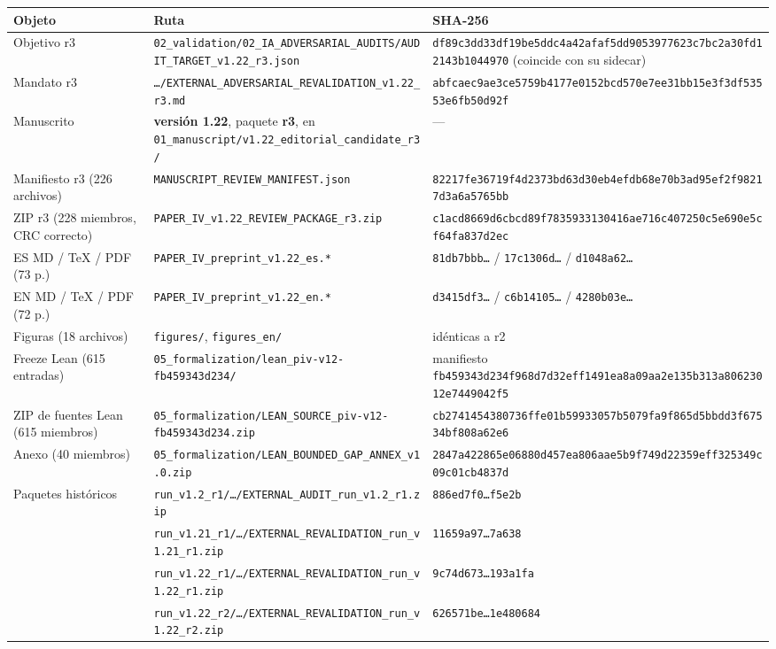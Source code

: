 \documentclass[
]{article}
\newcounter{none} %
\begin{document}
{\def\LTcaptype{none} %
\begin{longtable}[]{@{}lll@{}}
\toprule\noalign{}
Objeto & Ruta & SHA-256 \\
\midrule\noalign{}
\endhead
\bottomrule\noalign{}
\endlastfoot
Objetivo r3 &
\texttt{02\_validation/02\_IA\_ADVERSARIAL\_AUDITS/AUDIT\_TARGET\_v1.22\_r3.json}
&
\texttt{df89c3dd33df19be5ddc4a42afaf5dd9053977623c7bc2a30fd12143b1044970}
(coincide con su sidecar) \\
Mandato r3 &
\texttt{…/EXTERNAL\_ADVERSARIAL\_REVALIDATION\_v1.22\_r3.md} &
\texttt{abfcaec9ae3ce5759b4177e0152bcd570e7ee31bb15e3f3df53553e6fb50d92f} \\
Manuscrito & \textbf{versión 1.22}, paquete \textbf{r3}, en
\texttt{01\_manuscript/v1.22\_editorial\_candidate\_r3/} & --- \\
Manifiesto r3 (226 archivos) &
\texttt{MANUSCRIPT\_REVIEW\_MANIFEST.json} &
\texttt{82217fe36719f4d2373bd63d30eb4efdb68e70b3ad95ef2f98217d3a6a5765bb} \\
ZIP r3 (228 miembros, CRC correcto) &
\texttt{PAPER\_IV\_v1.22\_REVIEW\_PACKAGE\_r3.zip} &
\texttt{c1acd8669d6cbcd89f7835933130416ae716c407250c5e690e5cf64fa837d2ec} \\
ES MD / TeX / PDF (73 p.) & \texttt{PAPER\_IV\_preprint\_v1.22\_es.*} &
\texttt{81db7bbb…} / \texttt{17c1306d…} / \texttt{d1048a62…} \\
EN MD / TeX / PDF (72 p.) & \texttt{PAPER\_IV\_preprint\_v1.22\_en.*} &
\texttt{d3415df3…} / \texttt{c6b14105…} / \texttt{4280b03e…} \\
Figuras (18 archivos) & \texttt{figures/}, \texttt{figures\_en/} &
idénticas a r2 \\
Freeze Lean (615 entradas) &
\texttt{05\_formalization/lean\_piv-v12-fb459343d234/} & manifiesto
\texttt{fb459343d234f968d7d32eff1491ea8a09aa2e135b313a80623012e7449042f5} \\
ZIP de fuentes Lean (615 miembros) &
\texttt{05\_formalization/LEAN\_SOURCE\_piv-v12-fb459343d234.zip} &
\texttt{cb2741454380736ffe01b59933057b5079fa9f865d5bbdd3f67534bf808a62e6} \\
Anexo (40 miembros) &
\texttt{05\_formalization/LEAN\_BOUNDED\_GAP\_ANNEX\_v1.0.zip} &
\texttt{2847a422865e06880d457ea806aae5b9f749d22359eff325349c09c01cb4837d} \\
Paquetes históricos &
\texttt{run\_v1.2\_r1/…/EXTERNAL\_AUDIT\_run\_v1.2\_r1.zip} &
\texttt{886ed7f0…f5e2b} \\
& \texttt{run\_v1.21\_r1/…/EXTERNAL\_REVALIDATION\_run\_v1.21\_r1.zip} &
\texttt{11659a97…7a638} \\
& \texttt{run\_v1.22\_r1/…/EXTERNAL\_REVALIDATION\_run\_v1.22\_r1.zip} &
\texttt{9c74d673…193a1fa} \\
& \texttt{run\_v1.22\_r2/…/EXTERNAL\_REVALIDATION\_run\_v1.22\_r2.zip} &
\texttt{626571be…1e480684} \\
\end{longtable}
}
\end{document}
